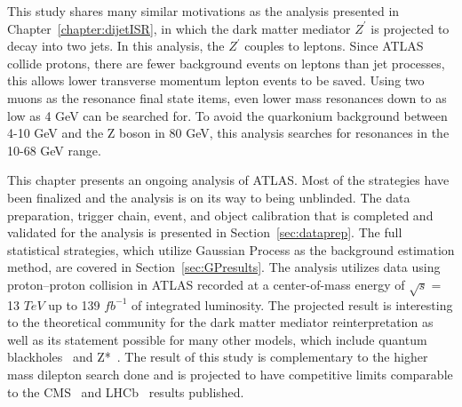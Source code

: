 This study shares many similar motivations as the analysis presented in Chapter~\ref{chapter:dijetISR}, in which the dark matter mediator $Z^\prime$ is projected to decay into two jets. In this analysis, the $Z^\prime$ couples to leptons. Since ATLAS collide protons, there are fewer background events on leptons than jet processes, this allows lower transverse momentum lepton events to be saved. Using two muons as the resonance final state items, even lower mass resonances
down to as low as 4 GeV can be searched for. To avoid the quarkonium background between 4-10 GeV and the Z boson in 80 GeV, this analysis searches for resonances in the 10-68 GeV range.

This chapter presents an ongoing analysis of ATLAS. Most of the strategies have been finalized and the analysis is on its way to being unblinded. The data preparation, trigger chain, event, and object calibration that is completed and validated for the analysis is presented in Section~\ref{sec:dataprep}. The full statistical strategies, which utilize Gaussian Process as the background estimation method, are covered in Section~\ref{sec:GPresults}. The analysis utilizes data using proton--proton collision in ATLAS
recorded at a center-of-mass energy of $\sqrt{s}=$ 13 $TeV$ up to 139 $fb^{-1}$ of integrated luminosity. The projected result is interesting to the theoretical community for the dark matter mediator reinterpretation as well as its statement possible for many other models, which include quantum blackholes~\cite{QBH2008} and Z*~\cite{ZStar2008}. The result of this study is complementary to the higher mass dilepton search done and is projected to have competitive limits comparable to the CMS~\cite{CMS-PAS-EXO-19-018} and LHCb~\cite{Aaij:2722971} results published.

